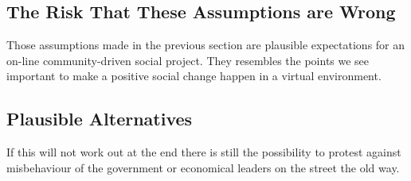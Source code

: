 \subsection{The Risk That These Assumptions are Wrong}
\label{subsec:riskofassumptions}

Those assumptions made in the previous section are plausible expectations for an on-line community-driven social project. They resembles the points we see important to make a positive social change happen in a virtual environment.

\subsection{Plausible Alternatives}
\label{subsec:plausiblealternatives}

If this will not work out at the end there is still the possibility to protest against misbehaviour of the government or economical leaders on the street the old way.

